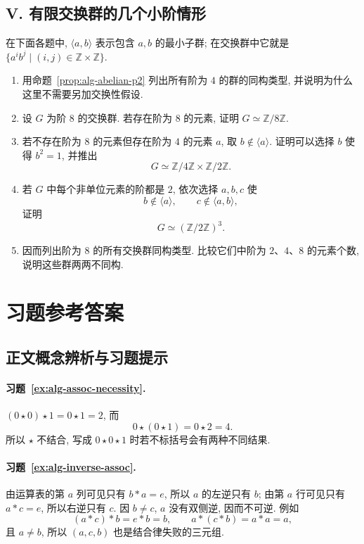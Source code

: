 \documentclass[usesamecnt, thmcnt=section, lang=cn, newtx, 10pt, scheme=chinese]{elegantbook}
\begin{document}
\subsection*{V. 有限交换群的几个小阶情形}
在下面各题中, $\langle a,b\rangle$ 表示包含 $a,b$ 的最小子群; 在交换群中它就是 $\{a^ib^j\mid (i,j)\in\mathbb Z\times\mathbb Z\}$.
\begin{enumerate}[label=\textbf{\arabic*.}, resume=alg-comp]
  \item 用命题~\ref{prop:alg-abelian-p2} 列出所有阶为 $4$ 的群的同构类型, 并说明为什么这里不需要另加交换性假设.
  \item 设 $G$ 为阶 $8$ 的交换群. 若存在阶为 $8$ 的元素, 证明 $G\simeq\mathbb Z/8\mathbb Z$.
  \item 若不存在阶为 $8$ 的元素但存在阶为 $4$ 的元素 $a$, 取 $b\notin\langle a\rangle$. 证明可以选择 $b$ 使得 $b^2=1$, 并推出
  \[
   G\simeq\mathbb Z/4\mathbb Z\times\mathbb Z/2\mathbb Z.
  \]
  \item 若 $G$ 中每个非单位元素的阶都是 $2$, 依次选择 $a,b,c$ 使
  \[
   b\notin\langle a\rangle,
   \qquad
   c\notin\langle a,b\rangle,
  \]
  证明
  \[
   G\simeq(\mathbb Z/2\mathbb Z)^3.
  \]
  \item 因而列出阶为 $8$ 的所有交换群同构类型. 比较它们中阶为 $2$、$4$、$8$ 的元素个数, 说明这些群两两不同构.
\end{enumerate}

\section{习题参考答案}

\subsection*{正文概念辨析与习题提示}



\paragraph*{习题~\ref{ex:alg-assoc-necessity}.}
$(0\star0)\star1=0\star1=2$, 而
\[
 0\star(0\star1)=0\star2=4.
\]
所以 $\star$ 不结合, 写成 $0\star0\star1$ 时若不标括号会有两种不同结果.



\paragraph*{习题~\ref{ex:alg-inverse-assoc}.}
由运算表的第 $a$ 列可见只有 $b*a=e$, 所以 $a$ 的左逆只有 $b$; 由第 $a$ 行可见只有 $a*c=e$, 所以右逆只有 $c$. 因 $b\neq c$, $a$ 没有双侧逆, 因而不可逆. 例如
\[
 (a*c)*b=e*b=b,
 \qquad
 a*(c*b)=a*a=a,
\]
且 $a\neq b$, 所以 $(a,c,b)$ 也是结合律失败的三元组.
\end{document}
